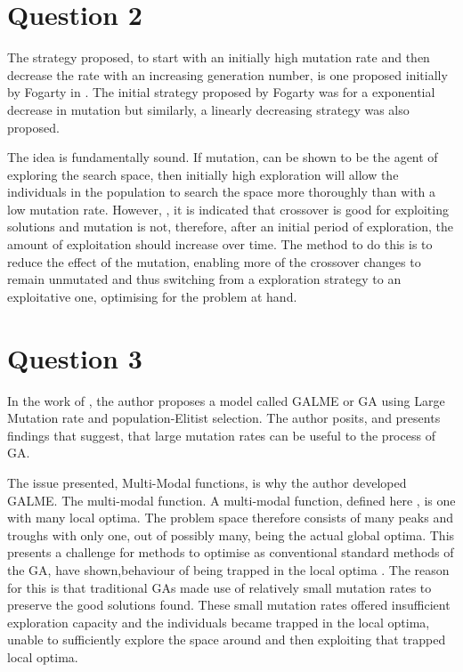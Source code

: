\documentclass[12pt]{article}
\begin{document}
\section{Question 2}
The strategy proposed, to start with an initially high mutation rate and then decrease the rate with an increasing generation number, is one proposed initially by Fogarty in \cite{Fogarty:1989:VPM:93126.93162}. The initial strategy proposed by Fogarty was for a exponential decrease in mutation but similarly, a linearly decreasing strategy was also proposed. 

The idea is fundamentally sound. If mutation, \cite{spears_1993} can be shown to be the agent of exploring the search space, then initially high exploration will allow the individuals in the population to search the space more thoroughly than with a low mutation rate. However, \cite{Gupta_anoverview}, it is indicated that crossover is good for exploiting solutions and mutation is not, therefore, after an initial period of exploration, the amount of exploitation should increase over time. The method to do this is to reduce the effect of the mutation, enabling more of the crossover changes to remain unmutated and thus switching from a exploration strategy to an exploitative one, optimising for the problem at hand.
\section{Question 3}
In the work of \cite{560396}, the author proposes a model called GALME or GA using Large Mutation rate and population-Elitist selection. The author posits, and presents findings that suggest, that large mutation rates can be useful to the process of GA.

The issue presented, Multi-Modal functions, is why the author developed GALME. The multi-modal function. A multi-modal function, defined here \cite{ECJC:ECJC5}, is one with many local optima. The problem space therefore consists of many peaks and troughs with only one, out of possibly many, being the actual global optima. This presents a challenge for methods to optimise as conventional standard methods of the GA, have shown,behaviour of being trapped in the local optima \cite{560396}. The reason for this is that traditional GAs made use of relatively small mutation rates to preserve the good solutions found. These small mutation rates offered insufficient exploration capacity and the individuals became trapped in the local optima, unable to sufficiently explore the space around and then exploiting that trapped local optima.
\end{document}
